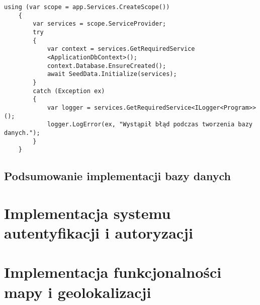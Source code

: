 \begin{lstlisting}[style=csharp, caption={Automatyczne tworzenie bazy danych}]
using (var scope = app.Services.CreateScope())
	{
		var services = scope.ServiceProvider;
		try
		{
			var context = services.GetRequiredService
			<ApplicationDbContext>();
			context.Database.EnsureCreated();
			await SeedData.Initialize(services);
		}
		catch (Exception ex)
		{
			var logger = services.GetRequiredService<ILogger<Program>>();
			logger.LogError(ex, "Wystąpił błąd podczas tworzenia bazy danych.");
		}
	}
\end{lstlisting}

\subsection{Podsumowanie implementacji bazy danych}

\FloatBarrier

\section{Implementacja systemu autentyfikacji i autoryzacji}

\section{Implementacja funkcjonalności mapy i geolokalizacji}
